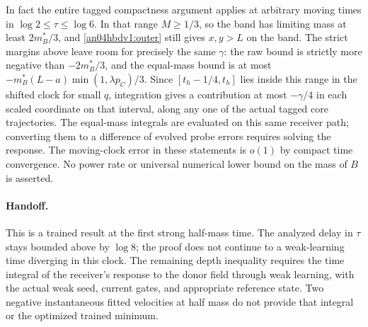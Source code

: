 \documentclass[11pt]{article}
\begin{document}
In fact the entire tagged compactness argument applies at arbitrary
moving times in $\log2\le\tau\le\log6$. In that range
$M\ge1/3$, so the band has limiting mass at least $2m_B^*/3$,
and \eqref{an04hbdv1:outer} still gives $x,y>L$ on the band.
The strict margins above leave room for precisely the same $\gamma$:
the raw bound is strictly more negative than $-2m_B^*/3$,
and the equal-mass bound is at most
$-m_B^*(L-a)\min(1,\lambda p_C)/3$.
Since $[t_h-1/4,t_h]$ lies inside this range in the shifted
clock for small $q$, integration gives a contribution at most
$-\gamma/4$ in each scaled coordinate on that interval, along any
one of the actual tagged core trajectories. The equal-mass integrals
are evaluated on this same receiver path; converting them to a
difference of evolved probe errors requires solving the response. The moving-clock error in these statements is $o(1)$
by compact time convergence. No power rate or universal numerical
lower bound on the mass of $B$ is asserted.

\paragraph{Handoff.}
This is a trained result at the first strong half-mass time. The
analyzed delay in $\tau$ stays bounded above by $\log8$; the proof
does not continue to a weak-learning time diverging in this clock.
The remaining depth inequality requires the time integral of the
receiver's response to the donor field through weak learning,
with the actual weak seed, current gates, and appropriate reference
state. Two negative instantaneous fitted velocities at half mass
do not provide that integral or the optimized trained minimum.
\end{document}
